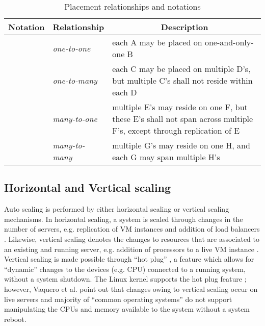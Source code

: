 \documentclass[10pt,journal,cspaper,compsoc]{IEEEtran}
\newcommand{\heading}[1]{\multicolumn{1}{|c|}{\bfseries #1}}
\begin{document}
\begin{table*}[!t]
\caption{Placement relationships and notations}
\label{tab:PlacementPolicies}
\centering
\begin{tabular}{|l|l|p{8cm}|}
\hline
\heading{Notation} & \heading{Relationship} & \heading{Description}\\
\hline

 & \emph{one-to-one}  & each A may be placed on one-and-only-one B \\
\hline

 & \emph{one-to-many} & each C may be placed on multiple D's, but multiple C's shall not reside within each D \\
\hline

 & \emph{many-to-one} & multiple E's may reside on one F, but these E's shall not span across multiple F's, except through replication of E\\
\hline


 & \emph{many-to-many} & multiple G's may reside on one H, and each G may span multiple H's \\
\hline
\end{tabular}
\end{table*}

\subsection{Horizontal and Vertical scaling}
\label{sec:HorizVertScaling}
Auto scaling is performed by either horizontal scaling or vertical scaling mechanisms. In horizontal scaling, a system is scaled through changes in the number of servers, e.g. replication of VM instances and addition of load balancers \cite{2011_DynamicallyScalingApps}. Likewise, vertical scaling denotes the changes to resources that are associated to an existing and running server, e.g. addition of processors to a live VM instance  \cite{2011_DynamicallyScalingApps}. Vertical scaling is made possible through ``hot plug'' \cite{2002_LinuxKernelHotplug}, a feature which allows for ``dynamic'' \cite{2010_DynamicProcDynamicOS} changes to the devices (e.g. CPU) connected to a running system, without a system shutdown. The Linux kernel supports the hot plug feature \cite{2002_LinuxKernelHotplug,2004_LinuxKernelHotplug}; however, Vaquero et al. \cite{2011_DynamicallyScalingApps} point out that changes owing to vertical scaling occur on live servers and majority of ``common operating systems'' \cite{2011_DynamicallyScalingApps} do not support manipulating the CPUs and memory available to the system without a system reboot.
\end{document}
